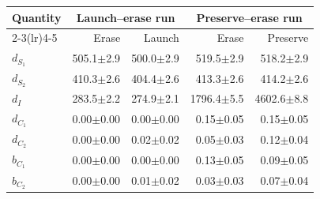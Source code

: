 \begingroup
\setlength{\tabcolsep}{3pt}
\begin{tabular}{@{}lrrrr@{}}
\toprule
Quantity & \multicolumn{2}{c}{Launch--erase run} & \multicolumn{2}{c}{Preserve--erase run} \\
\cmidrule(lr){2-3}\cmidrule(lr){4-5}
 & Erase & Launch & Erase & Preserve \\
\midrule
$d_{S_1}$ & 505.1\ensuremath{\pm}2.9 & 500.0\ensuremath{\pm}2.9 & 519.5\ensuremath{\pm}2.9 & 518.2\ensuremath{\pm}2.9 \\
$d_{S_2}$ & 410.3\ensuremath{\pm}2.6 & 404.4\ensuremath{\pm}2.6 & 413.3\ensuremath{\pm}2.6 & 414.2\ensuremath{\pm}2.6 \\
$d_I$ & 283.5\ensuremath{\pm}2.2 & 274.9\ensuremath{\pm}2.1 & 1796.4\ensuremath{\pm}5.5 & 4602.6\ensuremath{\pm}8.8 \\
$d_{C_1}$ & 0.00\ensuremath{\pm}0.00 & 0.00\ensuremath{\pm}0.00 & 0.15\ensuremath{\pm}0.05 & 0.15\ensuremath{\pm}0.05 \\
$d_{C_2}$ & 0.00\ensuremath{\pm}0.00 & 0.02\ensuremath{\pm}0.02 & 0.05\ensuremath{\pm}0.03 & 0.12\ensuremath{\pm}0.04 \\
$b_{C_1}$ & 0.00\ensuremath{\pm}0.00 & 0.00\ensuremath{\pm}0.00 & 0.13\ensuremath{\pm}0.05 & 0.09\ensuremath{\pm}0.05 \\
$b_{C_2}$ & 0.00\ensuremath{\pm}0.00 & 0.01\ensuremath{\pm}0.02 & 0.03\ensuremath{\pm}0.03 & 0.07\ensuremath{\pm}0.04 \\
\bottomrule
\end{tabular}
\endgroup

